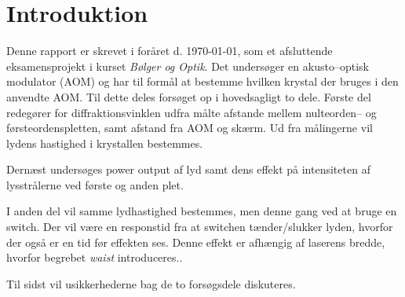 \documentclass[main]{subfiles}
\begin{document}
\section{Introduktion}
Denne rapport er skrevet i foråret d. \today, som et afsluttende eksamensprojekt i kurset \emph{Bølger og Optik}. Det undersøger en akusto--optisk modulator (AOM) og har til formål at bestemme hvilken krystal der bruges i den anvendte AOM. Til dette deles forsøget op i hovedsagligt to dele. Første del redegører for diffraktionsvinklen udfra målte afstande mellem nulteorden-- og førsteordenspletten, samt afstand fra AOM og skærm. Ud fra målingerne vil lydens hastighed i krystallen bestemmes.

Dernæst undersøges power output af lyd samt dens effekt på intensiteten af lysstrålerne ved første og anden plet.

I anden del vil samme lydhastighed bestemmes, men denne gang ved at bruge en switch. Der vil være en responstid fra at switchen tænder/slukker lyden, hvorfor der også er en tid før effekten ses. Denne effekt er afhængig af laserens bredde, hvorfor begrebet \emph{waist} introduceres..  

Til sidst vil usikkerhederne bag de to forsøgsdele diskuteres.
\end{document}
